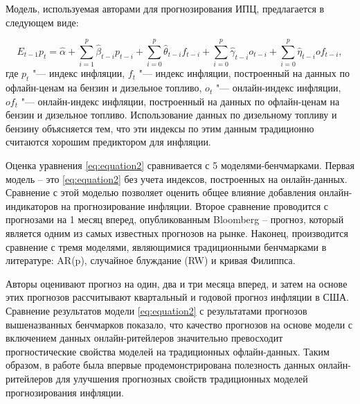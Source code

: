 Модель, используемая авторами для прогнозирования ИПЦ, предлагается в следующем виде:

\begin{equation}
	\label{eq:equation2}
	E_{t-1}p_t = \hat{\alpha} + \sum_{i=1}^p \hat{\beta}_{t-i} p_{t-i} + \sum_{i=0}^p \hat{\theta}_{t-i} f_{t-i} + \sum_{i=0}^p \hat{\gamma}_{t-i} o_{t-i} + \sum_{i=0}^p \hat{\eta}_{t-i} of_{t-i},
\end{equation}
где \( p_t \) "--- индекс инфляции, \( f_t \) "--- индекс инфляции, построенный на данных по офлайн-ценам на бензин и дизельное топливо, \( o_t \) "--- онлайн-индекс инфляции, \( of_t \) "--- онлайн-индекс инфляции, построенный на данных по офлайн-ценам на бензин и дизельное топливо. Использование данных по дизельному топливу и бензину объясняется тем, что эти индексы по этим данным традиционно считаются хорошим предиктором для инфляции.

Оценка уравнения \cref{eq:equation2} сравнивается с 5 моделями-бенчмарками. Первая модель – это \cref{eq:equation2} без учета индексов, построенных на онлайн-данных. Сравнение с этой моделью позволяет оценить общее влияние добавления онлайн-индикаторов на прогнозирование инфляции. Второе сравнение проводится с прогнозами на 1 месяц вперед, опубликованным Bloomberg – прогноз, который является одним из самых известных прогнозов на рынке. Наконец, производится сравнение с тремя моделями, являющимися традиционными бенчмарками в литературе: AR(p), случайное блуждание (RW) и кривая Филиппса.

Авторы оценивают прогноз на один, два и три месяца вперед, и затем на основе этих прогнозов рассчитывают квартальный и годовой прогноз инфляции в США. Сравнение результатов модели \cref{eq:equation2} с результатами прогнозов вышеназванных бенчмарков показало, что качество прогнозов на основе модели с включением данных онлайн-ритейлеров значительно превосходит прогностические свойства моделей на традиционных офлайн-данных. Таким образом, в работе была впервые продемонстрирована полезность данных онлайн-ритейлеров для улучшения прогнозных свойств традиционных моделей прогнозирования инфляции.

     \begin{table}[h!]
     	\centering
     	\caption{Прогнозы инфляции}
     	\label{tab:inflation_forecasts}
     \end{table}
     

